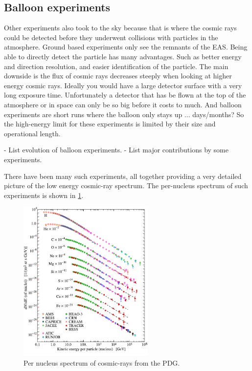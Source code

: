 \subsection{Balloon experiments}

Other experiments also took to the sky because that is where the cosmic rays could be detected before they underwent collisions with particles in the atmosphere. Ground based experiments only see the remnants of the EAS. Being able to directly detect the particle has many advantages. Such as better energy and direction resolution, and easier identification of the particle. The main downside is the flux of cosmic rays decreases steeply when looking at higher energy cosmic rays. Ideally you would have a large detector surface with a very long exposure time. Unfortunately a detector that has be flown at the top of the atmosphere or in space can only be so big before it costs to much. And balloon experiments are short runs where the balloon only stays up ... days/months? So the high-energy limit for these experiments is limited by their size and operational length.

- List evolution of balloon experiments.
- List major contributions by some experiments.

There have been many such experiments, all together providing a very detailed picture of the low energy cosmic-ray spectrum. The per-nucleus spectrum of such experiments is shown in \cref{fig:low_e_spectrum}.

\begin{figure}
    \centering
    \includegraphics[width=0.6\textwidth]
                    {plots/cosmic-rays/PDG_28_1_fluxes_per_nucleus}
    \caption{Per nucleus spectrum of cosmic-rays from the PDG.}
    \label{fig:low_e_spectrum}
\end{figure}


